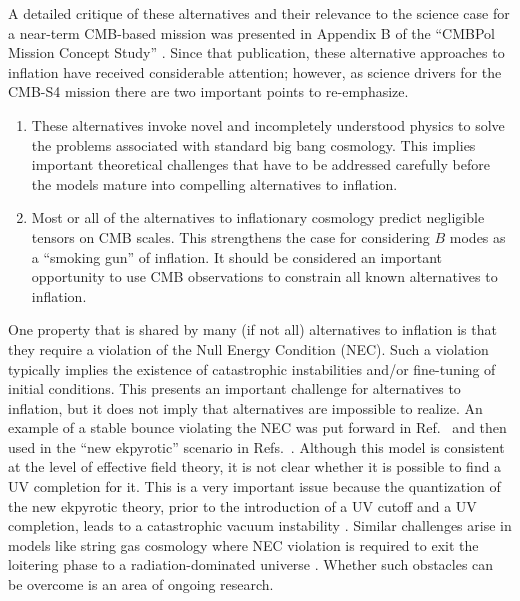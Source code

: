 A detailed critique of these alternatives and their relevance to the science case for a
near-term CMB-based mission was presented in Appendix B of the ``CMBPol
Mission Concept Study'' \cite{Baumann:2008aq}.  
Since that publication, these alternative approaches to inflation have received considerable attention;
however, as science drivers for the CMB-S4 mission there are two important points to re-emphasize.
\begin{enumerate}
\item These alternatives invoke novel and incompletely understood physics to solve the problems associated with standard big bang cosmology.  This implies important theoretical challenges that have to be addressed carefully before the models mature into compelling alternatives to inflation.

\item Most or all of the alternatives to inflationary cosmology predict negligible tensors on CMB scales.
This strengthens the case for considering $B$ modes as a ``smoking gun'' of inflation.  It should be considered an important
opportunity to use CMB observations to constrain all known alternatives to inflation.
\end{enumerate}

One property that is shared by many (if not all) alternatives to inflation is that they require a violation of the Null Energy Condition (NEC). 
Such a violation typically implies the existence of catastrophic instabilities and/or fine-tuning of initial conditions.
This presents an important challenge for alternatives to inflation, but it does not imply that alternatives are impossible to realize. 
An example of a stable bounce violating the NEC was put forward in Ref.~\cite{Creminelli:2006xe} and then used in the ``new ekpyrotic'' scenario in Refs.~\cite{Buchbinder:2007ad,Creminelli:2007aq}. Although this model is consistent at the level of effective field theory, it is not clear whether it is possible to find a UV completion for it. 
This is a very important issue because the quantization of the new ekpyrotic theory, prior to the introduction of a UV cutoff and a UV completion, leads to a catastrophic vacuum instability \cite{Kallosh:2007ad}.  Similar challenges arise in models like string gas cosmology where NEC violation is required to exit the loitering phase to a radiation-dominated universe
\cite{Brustein:1994kw,Kaloper:1995ey,Kaloper:1995tu,Kaloper:2007pw}.  Whether such obstacles can be overcome is an area of ongoing research.

